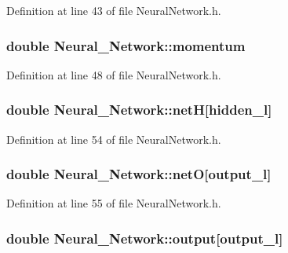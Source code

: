 Definition at line 43 of file Neural\-Network.\-h.

\hypertarget{a00003_a3a3ea713384da26e538bc60da8410a75}{
\subsubsection[{momentum}]{\setlength{\rightskip}{0pt plus 5cm}double Neural\-\_\-\-Network\-::momentum\hspace{0.3cm}{\ttfamily [private]}}}\label{d1/d7c/a00003_a3a3ea713384da26e538bc60da8410a75}


Definition at line 48 of file Neural\-Network.\-h.

\hypertarget{a00003_aa07e5b1f8997f895d7550495a5b4f0d2}{
\subsubsection[{net\-H}]{\setlength{\rightskip}{0pt plus 5cm}double Neural\-\_\-\-Network\-::net\-H\mbox{[}{\bf hidden\-\_\-l}\mbox{]}\hspace{0.3cm}{\ttfamily [private]}}}\label{d1/d7c/a00003_aa07e5b1f8997f895d7550495a5b4f0d2}


Definition at line 54 of file Neural\-Network.\-h.

\hypertarget{a00003_a8bcf19afde3c08afbd862759c839a769}{
\subsubsection[{net\-O}]{\setlength{\rightskip}{0pt plus 5cm}double Neural\-\_\-\-Network\-::net\-O\mbox{[}{\bf output\-\_\-l}\mbox{]}\hspace{0.3cm}{\ttfamily [private]}}}\label{d1/d7c/a00003_a8bcf19afde3c08afbd862759c839a769}


Definition at line 55 of file Neural\-Network.\-h.

\hypertarget{a00003_abe5631cce6141b7756154a5a9d247da2}{
\subsubsection[{output}]{\setlength{\rightskip}{0pt plus 5cm}double Neural\-\_\-\-Network\-::output\mbox{[}{\bf output\-\_\-l}\mbox{]}\hspace{0.3cm}{\ttfamily [private]}}}\label{d1/d7c/a00003_abe5631cce6141b7756154a5a9d247da2}


